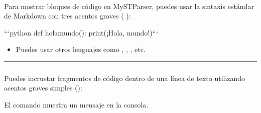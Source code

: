 \documentclass[a4paper,10pt,oneside,spanish,openany]{sphinxmanual}
\begin{document}
\paragraph{}
\label{\detokenize{configuracion_inicial/013.guia_de_myst_parser:bloques-de-codigo-code-blocks}}
\sphinxAtStartPar
Para mostrar bloques de código en MyST\sphinxhyphen{}Parser, puedes usar la sintaxis estándar de Markdown con tres acentos graves (  ):

\begin{sphinxVerbatim}[commandchars=\\\{\}]
	```python
	def hola\PYGZus{}mundo():
	    print(\PYGZdq{}¡Hola, mundo!\PYGZdq{})```
\end{sphinxVerbatim}

\sphinxAtStartPar
{}

\begin{sphinxVerbatim}[commandchars=\\\{\}]
 
\end{sphinxVerbatim}
\begin{itemize}
\item {} 
\sphinxAtStartPar
Puedes usar otros lenguajes como , , , etc.

\end{itemize}


\bigskip\hrule\bigskip



\subsubsection{}
\label{\detokenize{configuracion_inicial/013.guia_de_myst_parser:incrustar-codigo-en-linea}}
\sphinxAtStartPar
Puedes incrustar fragmentos de código dentro de una línea de texto utilizando acentos graves simples (\textasciigrave{}):

\begin{sphinxVerbatim}[commandchars=\\\{\}]
El comando  muestra un mensaje en la consola.
\end{sphinxVerbatim}
\end{document}

